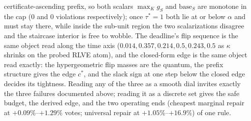 \documentclass{article}
\theoremstyle{definition}
\theoremstyle{remark}
\begin{document}
certificate-ascending prefix, so both scalars $\max_K g_S$ and
$\mathrm{base}_S$ are monotone in the cap ($0$ and $0$ violations
respectively); once $\tau^*{=}1$ both lie at or below $\alpha$ and
must stay there, while inside the sub-unit region the two
scalarizations disagree and the staircase interior is free to wobble.
The deadline's flip sequence is the same object read along the time
axis ($0.014, 0.357, 0.214, 0.5, 0.243, 0.5$ as $\kappa$ shrinks on
the probed RLVE atom), and the closed-form edge is the same object
read exactly: the hypergeometric flip masses are the quantum, the
prefix structure gives the edge $c^*$, and the slack sign at one step
below the closed edge decides its tightness. Reading any of the three
as a smooth dial invites exactly the three failures documented above;
reading it as a discrete set gives the safe budget, the derived edge,
and the two operating ends (cheapest marginal repair at
${+}0.09\%$--${+}1.29\%$ votes; universal repair at
${+}1.05\%$--${+}16.9\%$) of one rule.
\end{document}

